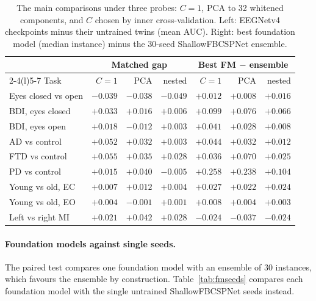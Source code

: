 \documentclass[11pt]{article}
\begin{document}
\begin{table}[h]
\centering\footnotesize\setlength{\tabcolsep}{4pt}
\caption{The main comparisons under three probes: $C = 1$, PCA to 32 whitened components, and
$C$ chosen by inner cross-validation. Left: EEGNetv4 checkpoints minus their untrained twins (mean
AUC). Right: best foundation model (median instance) minus the 30-seed ShallowFBCSPNet ensemble.}
\label{tab:probes}
\begin{tabular}{@{}lrrrrrr@{}}
\toprule
& \multicolumn{3}{c}{Matched gap} & \multicolumn{3}{c}{Best FM $-$ ensemble} \\
\cmidrule(lr){2-4}\cmidrule(l){5-7}
Task & $C = 1$ & PCA & nested & $C = 1$ & PCA & nested \\
\midrule
Eyes closed vs open & $-0.039$ & $-0.038$ & $-0.049$ & $+0.012$ & $+0.008$ & $+0.016$ \\
BDI, eyes closed & $+0.033$ & $+0.016$ & $+0.006$ & $+0.099$ & $+0.076$ & $+0.066$ \\
BDI, eyes open & $+0.018$ & $-0.012$ & $+0.003$ & $+0.041$ & $+0.028$ & $+0.008$ \\
AD vs control & $+0.052$ & $+0.032$ & $+0.003$ & $+0.044$ & $+0.032$ & $+0.012$ \\
FTD vs control & $+0.055$ & $+0.035$ & $+0.028$ & $+0.036$ & $+0.070$ & $+0.025$ \\
PD vs control & $+0.015$ & $+0.040$ & $-0.005$ & $+0.258$ & $+0.238$ & $+0.104$ \\
Young vs old, EC & $+0.007$ & $+0.012$ & $+0.004$ & $+0.027$ & $+0.022$ & $+0.024$ \\
Young vs old, EO & $+0.004$ & $-0.001$ & $+0.001$ & $+0.008$ & $+0.004$ & $+0.003$ \\
Left vs right MI & $+0.021$ & $+0.042$ & $+0.028$ & $-0.024$ & $-0.037$ & $-0.024$ \\
\bottomrule
\end{tabular}
\end{table}

\paragraph{Foundation models against single seeds.} The paired test compares one foundation
model with an ensemble of 30 instances, which favours the ensemble by construction.
Table~\ref{tab:fmseeds} compares each foundation model with the single untrained ShallowFBCSPNet
seeds instead.
\end{document}
